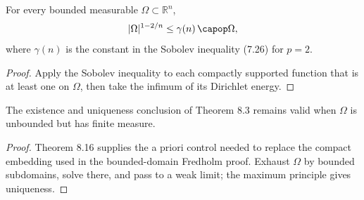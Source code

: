 \begin{lemma}
\label{gt-lem-8-capacity-measure}
For every bounded measurable $\Omega\subset\mathbb R^n$,
\[
|\Omega|^{1-2/n}\leq\gamma(n)\,\capop\Omega,
\]
where $\gamma(n)$ is the constant in the Sobolev inequality (7.26) for $p=2$.
\end{lemma}
\begin{proof}
\sketch Apply the Sobolev inequality to each compactly supported function that
is at least one on $\Omega$, then take the infimum of its Dirichlet energy.
\end{proof}

\begin{theorem}
\label{gt-thm-8-finite-measure-unbounded-dirichlet}
The existence and uniqueness conclusion of Theorem 8.3 remains valid when
$\Omega$ is unbounded but has finite measure.
\end{theorem}
\begin{proof}
\sketch Theorem 8.16 supplies the a priori control needed to replace the compact
embedding used in the bounded-domain Fredholm proof. Exhaust $\Omega$ by
bounded subdomains, solve there, and pass to a weak limit; the maximum principle
gives uniqueness.
\end{proof}
